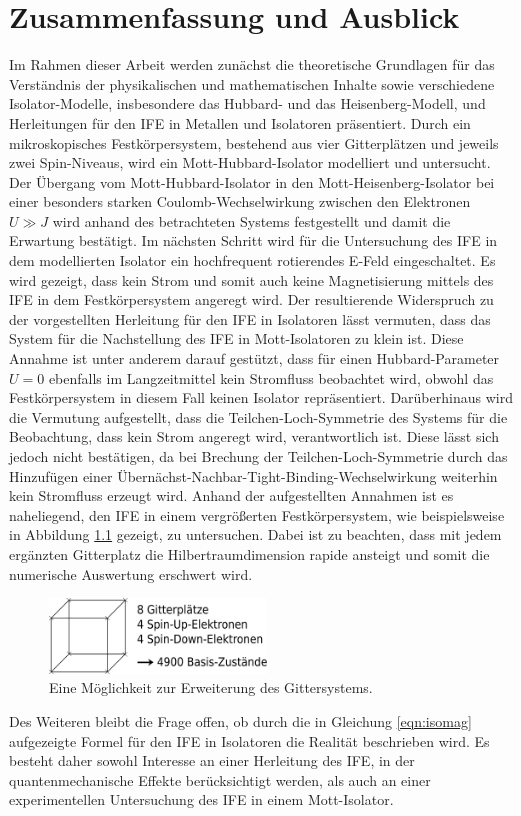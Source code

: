 \chapter{Zusammenfassung und Ausblick}
\label{ch:ausblick}

Im Rahmen dieser Arbeit werden zunächst die theoretische Grundlagen für das Verständnis der physikalischen und mathematischen Inhalte sowie
verschiedene Isolator-Modelle, insbesondere das Hubbard- und das Heisenberg-Modell, und Herleitungen für den IFE in Metallen und Isolatoren präsentiert.
Durch ein mikroskopisches Festkörpersystem, bestehend aus vier Gitterplätzen und jeweils zwei Spin-Niveaus, wird ein Mott-Hubbard-Isolator modelliert
und untersucht. Der Übergang vom Mott-Hubbard-Isolator in den Mott-Heisenberg-Isolator bei einer besonders starken Coulomb-Wechselwirkung zwischen den Elektronen
$U \gg J$ wird anhand des betrachteten Systems festgestellt und damit die Erwartung bestätigt.
Im nächsten Schritt wird für die Untersuchung des IFE in dem modellierten Isolator ein hochfrequent rotierendes E-Feld eingeschaltet.
Es wird gezeigt, dass kein Strom und somit auch keine Magnetisierung mittels des IFE in dem Festkörpersystem angeregt wird. Der  resultierende Widerspruch
zu der vorgestellten Herleitung für den IFE in Isolatoren lässt vermuten, dass das System für die Nachstellung des IFE in Mott-Isolatoren zu klein ist.
Diese Annahme ist unter anderem darauf gestützt, dass für einen Hubbard-Parameter $U=0$ ebenfalls im Langzeitmittel kein Stromfluss beobachtet wird,
obwohl das Festkörpersystem in diesem Fall keinen Isolator repräsentiert.
Darüberhinaus wird die Vermutung aufgestellt, dass die Teilchen-Loch-Symmetrie des Systems für die Beobachtung, dass kein Strom angeregt wird, verantwortlich ist.
Diese lässt sich jedoch nicht bestätigen, da bei Brechung der Teilchen-Loch-Symmetrie durch das Hinzufügen einer Übernächst-Nachbar-Tight-Binding-Wechselwirkung
weiterhin kein Stromfluss erzeugt wird.
Anhand der aufgestellten Annahmen ist es naheliegend, den IFE in einem vergrößerten Festkörpersystem, wie beispielsweise
in Abbildung \ref{fig:gitterausblick} gezeigt, zu untersuchen. Dabei ist zu beachten, dass mit jedem ergänzten Gitterplatz
die Hilbertraumdimension rapide ansteigt und somit die numerische Auswertung erschwert wird.

\begin{figure}
  \centering
  \includegraphics[height=2cm]{Graphiken/gitterausblick.pdf}
  \caption{Eine Möglichkeit zur Erweiterung des Gittersystems.}
  \label{fig:gitterausblick}
\end{figure}

Des Weiteren bleibt die Frage offen, ob durch die in Gleichung \eqref{eqn:isomag} aufgezeigte Formel für den IFE in Isolatoren
die Realität beschrieben wird. Es besteht daher sowohl Interesse an einer Herleitung des IFE, in der quantenmechanische
Effekte berücksichtigt werden, als auch an einer experimentellen Untersuchung des IFE in einem Mott-Isolator.
